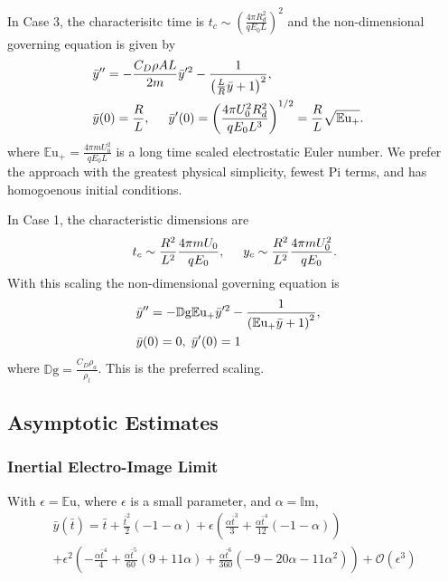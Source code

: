 \documentclass[a4paper, 12pt]{article}
\begin{document}
In Case 3, the characterisitc time is $t_c \sim \left( \frac{4 \pi R_d^2}{q E_0 L} \right)^2 $ and the non-dimensional governing equation is given by
\begin{eqnarray}
&\bar{y}'' = - \frac{C_D \rho A L}{2 m} \bar{y}'^2 - \frac{1}{\left( \frac{L}{R} \bar{y} + 1\right)^2} ,& \nonumber \\
& \bar{y}(0) = \frac{R}{L}, \hspace{5 mm} \bar{y}'(0) = \left( \frac{4 \pi U_0^2 R_d^2}{q E_0 L^3}\right)^{1/2} = \frac{R}{L} \sqrt{\mathbb{E}\mbox{u}_+}.& \nonumber
\end{eqnarray}
where $\mathbb{E}\mbox{u}_+ = \frac{4 \pi m U_0^2}{q E_0 L}$ is a long time scaled electrostatic Euler number. We prefer the approach with the greatest physical simplicity, fewest Pi terms, and has homogoenous initial conditions.

In Case 1, the characteristic dimensions are
\[ t_c \sim \frac{R^2}{L^2} \frac{4 \pi m U_0}{q E_0}, \hspace{5mm} y_c \sim \frac{R^2}{L^2} \frac{4 \pi m U_0^2}{q E_0}.
\]
With this scaling the non-dimensional governing equation is 
\begin{eqnarray}
&\bar{y}'' = - \mathbb{D}\mbox{g} \mathbb{E}\mbox{u}_+ \bar{y}'^2 - \frac{1}{\left( \mathbb{E}\mbox{u}_+ \bar{y} + 1 \right)^2}, & \nonumber \\
& \bar{y}(0) = 0, \hspace{1 mm} \bar{y}'(0) = 1 & 
\end{eqnarray}
where $\mathbb{D}\mbox{g} = \frac{C_D \rho_a}{\rho_l}$. This is the preferred scaling.

\subsection{Asymptotic Estimates}


\subsubsection{Inertial Electro-Image Limit}
With $\epsilon = \mathbb{E}\mbox{u}$, where $\epsilon$ is a small parameter, and $\alpha = \mathbb{I}\mbox{m}$,
\begin{eqnarray*}
&\bar{y}(\bar{t}) = \bar{t} + \frac{\bar{t}^{2}}{2} \left(-1 - \alpha\right) + \epsilon \left(\frac{\alpha \bar{t}^{3}}{3} + \frac{\alpha \bar{t}^{4}}{12} \left(-1 - \alpha\right)\right)& \\
&+ \epsilon^{2} \left(- \frac{\alpha \bar{t}^{4}}{4} + \frac{\alpha \bar{t}^{5}}{60} \left(9 + 11 \alpha\right) + \frac{\alpha \bar{t}^{6}}{360} \left(-9 - 20 \alpha - 11 \alpha^{2}\right)\right) + \mathcal{O}(\epsilon^3)&
\end{eqnarray*}
\end{document}
